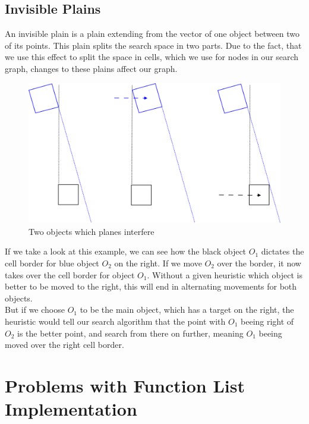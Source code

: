 \subsection{Invisible Plains}
An invisible plain is a plain extending from the vector of one object between two of its points. This plain splits the search space in two parts. Due to the fact, that we use this effect to split the space in cells, which we use for nodes in our search graph, changes to these plains affect our graph.\\
\begin{figure}[H]
\centering
\includegraphics[scale=0.3]{ghostplanes}
\caption{Two objects which planes interfere}
\end{figure}
If we take a look at this example, we can see how the black object $O_1$ dictates the cell border for blue object $O_2$ on the right. If we move  $O_2$ over the border, it now takes over the cell border for object  $O_1$. Without a given heuristic which object is better to be moved to the right, this will end in alternating movements for both objects.\\
But if we choose  $O_1$ to be the main object, which has a target on the right, the heuristic would tell our search algorithm that the point with $O_1$ beeing right of  $O_2$ is the better point, and search from there on further, meaning $O_1$ beeing moved over the right cell border.

\section{Problems with Function List Implementation}
